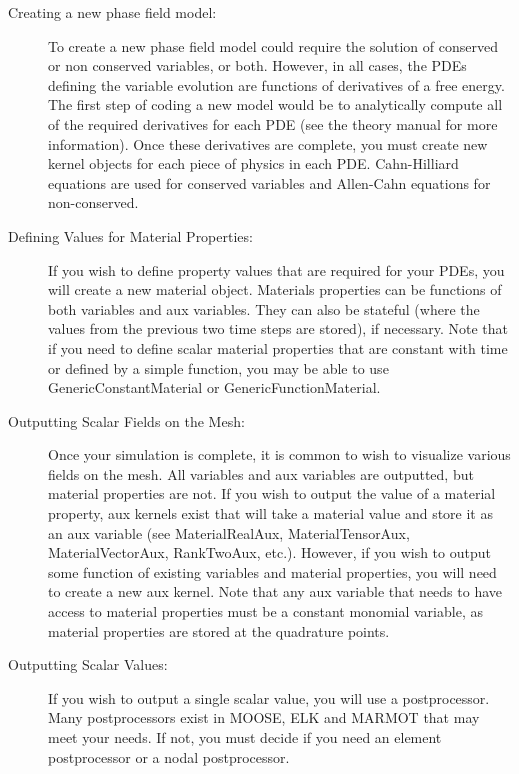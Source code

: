 \documentclass[letter,12pt,fleqn]{article}
\begin{document}
\begin{description}
\item[Creating a new phase field model:] To create a new phase field model could require the solution of conserved or non conserved variables, or both. However, in all cases, the PDEs defining the variable evolution are functions of derivatives of a free energy. The first step of coding a new model would be to analytically compute all of the required derivatives for each PDE (see the theory manual for more information). Once these derivatives are complete, you must create new kernel objects for each piece of physics in each PDE. Cahn-Hilliard equations are used for conserved variables and Allen-Cahn equations for non-conserved. 

\item[Defining Values for Material Properties:] If you wish to define property values that are required for your PDEs, you will create a new material object. Materials properties can be functions of both variables and aux variables. They can also be stateful (where the values from the previous two time steps are stored), if necessary. Note that if you need to define scalar material properties that are constant with time or defined by a simple function, you may be able to use GenericConstantMaterial or GenericFunctionMaterial.

\item[Outputting Scalar Fields on the Mesh:] Once your simulation is complete, it is common to wish to visualize various fields on the mesh. All variables and aux variables are outputted, but material properties are not. If you wish to output the value of a material property, aux kernels exist that will take a material value and store it as an aux variable (see MaterialRealAux, MaterialTensorAux, MaterialVectorAux, RankTwoAux, etc.). However, if you wish to output some function of existing variables and material properties, you will need to create a new aux kernel. Note that any aux variable that needs to have access to material properties must be a constant monomial variable, as material properties are stored at the quadrature points.

\item[Outputting Scalar Values:] If you wish to output a single scalar value, you will use a postprocessor. Many postprocessors exist in MOOSE, ELK and MARMOT that may meet your needs. If not, you must decide if you need an element postprocessor or a nodal postprocessor.

\end{description}
\end{document}

